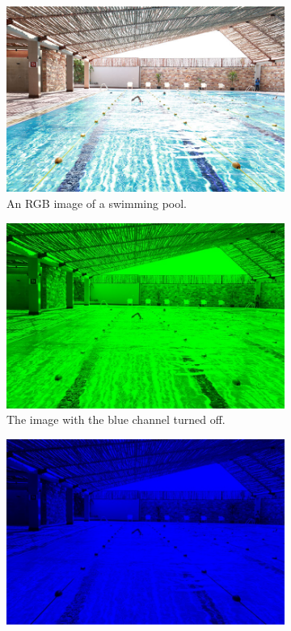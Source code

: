 \documentclass[addpoints]{exam}
\begin{document}
  \begin{figure}
    \centering
    \begin{subfigure}{.3\textwidth}
      \includegraphics[width=\textwidth]{pool}
      \caption{An RGB image of a swimming pool.}
    \end{subfigure}
    \begin{subfigure}{.3\textwidth}
      \includegraphics[width=\textwidth]{pool-sans-blue}
      \caption{The image with the blue channel turned off.}
    \end{subfigure}
    \begin{subfigure}{.3\textwidth}
      \includegraphics[width=\textwidth]{pool-only-blue}

\end{subfigure}
\end{figure}
\end{document}
